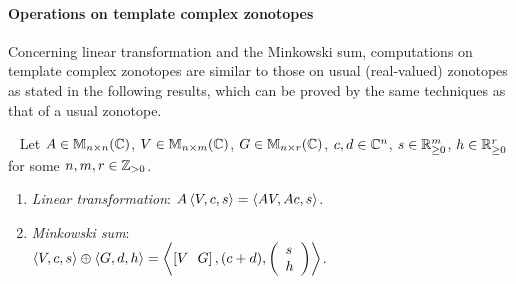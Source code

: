 \paragraph*{\bf Operations on template complex zonotopes}
Concerning linear transformation and the Minkowski sum, computations
on template complex zonotopes are similar to those on usual (real-valued) zonotopes
as stated in the following results, which can be proved by the same
techniques as that of a usual zonotope. %
%
\begin{lem}~\label{lem:lt}
  Let $A\in\mathbb{M}_{n\times n}(\mathbb{C})$, $V\in\mathbb{M}_{n\times m}(\mathbb{C})$, $G\in\mathbb{M}_{n\times r}(\mathbb{C})$, $c,d\in\mathbb{C}^n$, $s\in{{\mathbb{R}}}^m_{\geq 0}$,
  $h\in\mathbb{R}^r_{\geq 0}$ for some $n,m,r\in\mathbb{Z}_{> 0}$.
  
\begin{enumerate}%
\item \emph{Linear transformation}: $A\left<V,c,s\right>=\left<AV,Ac,s\right>$.
\item \emph{Minkowski sum}:\\ $\left<V,c,s\right>\oplus\left<G,d,h\right>=\left<\left[V~~G\right],(c+d),\left(\begin{array}{l}s\\h\end{array}\right)\right>$.
\end{enumerate}
\end{lem}
%

